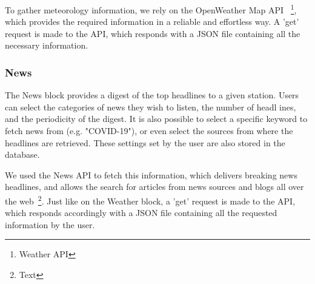 To gather meteorology information, we rely on the OpenWeather Map \ac{API} ~\footnote{Weather API}, which provides the required information in a reliable and effortless way. A 'get' request is made to the \ac{API}, which responds with a JSON file containing all the necessary information. 

\newpage
\subsubsection{News}

The News block provides a digest of the top headlines to a given station. Users can select the categories of news they wish to listen, the number of headl ines, and the periodicity of the digest. It is also possible to select a specific keyword to fetch news from (e.g. "COVID-19"), or even select the sources from where the headlines are retrieved. These settings set by the user are also stored in the database.

We used the News \ac{API} to fetch this information, which delivers breaking news headlines, and allows the search for articles from news sources and blogs all over the web~\footnote{Text}. Just like on the Weather block, a 'get' request is made to the \ac{API}, which responds accordingly with a JSON file containing all the requested information by the user.

